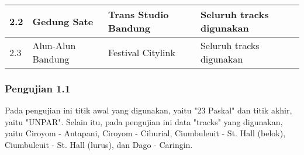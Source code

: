 \begin{table}[H]
{\begin{tabular}{|l|l|l|l|}
2.2                                      & Gedung Sate                              & Trans Studio Bandung                      & Seluruh tracks digunakan                                                                                                                                                 \\ \hline
2.3                                      & Alun-Alun Bandung                        & Festival Citylink                         & Seluruh tracks digunakan                                                                                                                                                 \\ \hline
\end{tabular}
}
\end{table}

\subsubsection{Pengujian 1.1}
Pada pengujian ini titik awal yang digunakan, yaitu "23 Paskal" dan titik akhir, yaitu "UNPAR". Selain itu, pada pengujian ini data "tracks" yang digunakan, yaitu Ciroyom - Antapani, Ciroyom - Ciburial, Ciumbuleuit - St. Hall (belok), Ciumbuleuit - St. Hall (lurus), dan Dago - Caringin.

\begin{comment}
\begin{table}[H]
\centering
\caption{Data Pengujian 1.1}
\label{tab:data1.1}
{\large
\begin{tabular}{|l|l|}
\hline
\textbf{trackId}       & \textbf{trackName}             \\ \hline
ciroyomantapani & Ciroyom - Antapani \\ \hline
ciroyomciburial & Ciroyom - Ciburial \\ \hline
ciumbuleuitsthallbelok   & Ciumbuleuit - St. Hall (belok)     \\ \hline
ciumbuleuitsthalllurus        & Ciumbuleuit - St. Hall (lurus)             \\ \hline
dagocaringin        & Dago - Caringin             \\ \hline
\end{tabular}
}
\end{table}
\end{comment}

